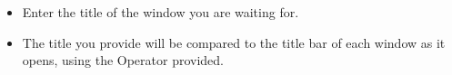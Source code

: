 
\begin{itemize}
\item Enter the title of the window you are waiting for. 
\item The title you provide will be compared to the title bar of each window as it opens, using the Operator provided.
\end{itemize}

